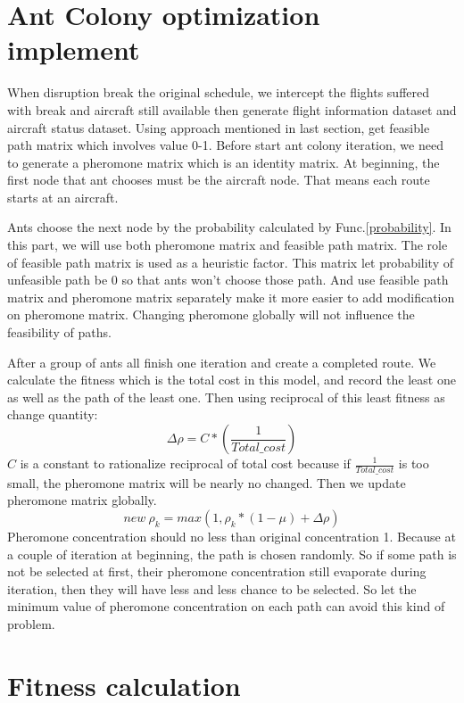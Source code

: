\documentclass[senior]{IPSstyle}
\begin{document}
\section{Ant Colony optimization implement}
When disruption break the original schedule, we intercept the flights suffered with break and aircraft still available then generate flight information dataset and aircraft status dataset. Using approach mentioned in last section, get feasible path matrix which involves value 0-1. 
Before start ant colony iteration, we need to generate a 
pheromone matrix which is an identity matrix.
At beginning, the first node that ant chooses must be the aircraft node. That means each route starts at an aircraft.

Ants choose the next node by the probability calculated by Func.\ref{probability}. In this part, we will use both pheromone matrix and feasible path matrix.
The role of feasible path matrix is used as a heuristic factor. This matrix let probability of unfeasible path be 0 so that ants won't choose those path. And use feasible path matrix and pheromone matrix separately make it more easier to add modification on pheromone matrix. Changing pheromone globally will not influence the feasibility of paths.

After a group of ants all finish one iteration and create a completed route. We calculate the fitness which is the total cost in this model, and record the least one as well as the path of the least one. Then using reciprocal of this least fitness as change quantity:
\begin{equation}\label{func:delta pheromone}
    \Delta\rho = C * \left( \frac{1}{Total\_cost} \right)
\end{equation}
\(C\) is a constant to rationalize reciprocal of total cost because if $\frac{1}{Total\_cost}$ is too small, the pheromone matrix will be nearly no changed. Then we update pheromone matrix globally. 
\begin{equation}
    new\ \rho_k = max(1, \rho_k * (1-\mu) + \Delta\rho)
\end{equation}
Pheromone concentration should no less than original concentration 1. Because at a couple of iteration at beginning, the path is chosen randomly. So if some path is not be selected at first, their pheromone concentration still evaporate during iteration, then they will have less and less chance to be selected. So let the minimum value of pheromone concentration on each path can avoid this kind of problem.

\section{Fitness calculation}\label{Fitness calculation}
\end{document}
